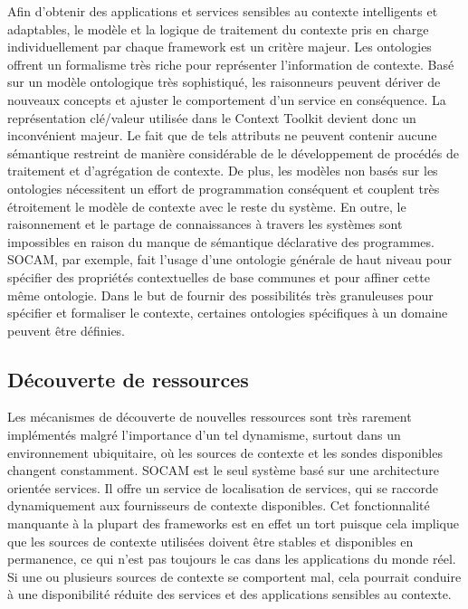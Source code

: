 Afin d'obtenir des applications et services sensibles au contexte intelligents
et adaptables, le modèle et la logique de traitement du contexte pris en charge
individuellement par chaque framework est un critère majeur. Les ontologies
offrent un formalisme très riche pour représenter l'information de contexte.
Basé sur un modèle ontologique très sophistiqué, les raisonneurs peuvent dériver
de nouveaux concepts et ajuster le comportement d'un service en conséquence. La
représentation clé/valeur utilisée dans le Context Toolkit devient donc un
inconvénient majeur. Le fait que de tels attributs ne peuvent contenir aucune
sémantique restreint de manière considérable de le développement de procédés de
traitement et d'agrégation de contexte. De plus, les modèles non basés sur les
ontologies nécessitent un effort de programmation conséquent et couplent très
étroitement le modèle de contexte avec le reste du système. En outre, le
raisonnement et le partage de connaissances à travers les systèmes sont
impossibles en raison du manque de sémantique déclarative des programmes. SOCAM,
par exemple, fait l'usage d'une ontologie générale de haut niveau pour spécifier
des propriétés contextuelles de base communes et pour affiner cette même
ontologie. Dans le but de fournir des possibilités très granuleuses pour
spécifier et formaliser le contexte, certaines ontologies spécifiques à un
domaine peuvent être définies.

\subsection{Découverte de ressources}

Les mécanismes de découverte de nouvelles ressources sont très rarement
implémentés malgré l'importance d'un tel dynamisme, surtout dans un environnement
ubiquitaire, où les sources de contexte et les sondes disponibles changent
constamment. SOCAM est le seul système basé sur une architecture orientée
services. Il offre un service de localisation de services, qui se raccorde
dynamiquement aux fournisseurs de contexte disponibles. Cet fonctionnalité
manquante à la plupart des frameworks est en effet un tort puisque cela implique
que les sources de contexte utilisées doivent être stables et disponibles en
permanence, ce qui n'est pas toujours le cas dans les applications du monde
réel. Si une ou plusieurs sources de contexte se comportent mal, cela pourrait
conduire à une disponibilité réduite des services et des applications sensibles
au contexte.

